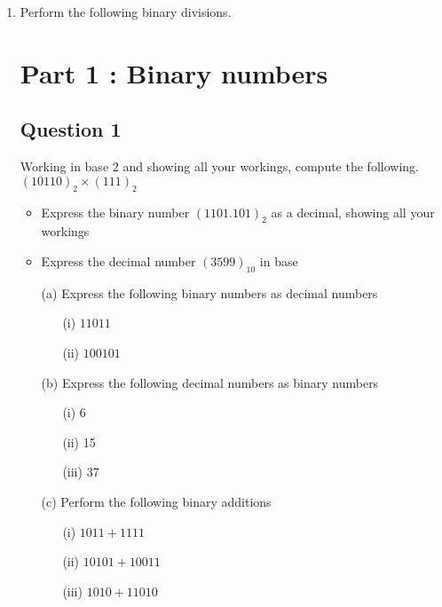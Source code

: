 \documentclass[]{report}
\begin{document}
\begin{enumerate}
	\item Perform the following binary divisions.
	

\section*{Part 1 : Binary numbers}
\subsection*{Question 1 }
Working in base 2 and showing all your workings, compute the following.
$(10110)_2 \times (111)_2$

\begin{itemize}
\item Express the binary number $(1101.101)_2$ as a decimal, showing all your workings
\item Express the decimal number $(3599)_{10}$ in base 
\end{itemize}



\begin{itemize}
\item[(a)] Express the following binary numbers as decimal numbers
\begin{itemize}
\item[(i)] $11011$
\item[(ii)] $100101$
\end{itemize}
\item[(b)] Express the following decimal numbers as binary numbers
\begin{itemize}
\item[(i)] 6
\item[(ii)] 15
\item[(iii)] 37
\end{itemize}
\item[(c)] Perform the following binary additions
\begin{itemize}
\item[(i)] $1011+ 1111$
\item[(ii)] $10101  + 10011$
\item[(iii)] $1010 + 11010$
\end{itemize}


\end{itemize}
\end{enumerate}
\end{document}
